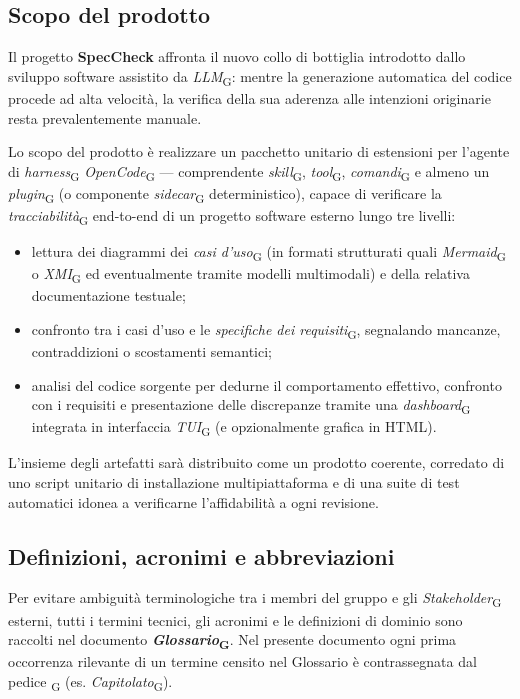 \documentclass[11pt, a4paper]{article}
\newcommand{\glossario}[1]{\textit{#1}\textsubscript{G}}
\begin{document}
\subsection{Scopo del prodotto}
Il progetto \textbf{SpecCheck} affronta il nuovo collo di bottiglia introdotto dallo sviluppo software assistito da \glossario{LLM}: mentre la generazione automatica del codice procede ad alta velocità, la verifica della sua aderenza alle intenzioni originarie resta prevalentemente manuale.

Lo scopo del prodotto è realizzare un pacchetto unitario di estensioni per l'agente di \glossario{harness} \glossario{OpenCode} --- comprendente \glossario{skill}, \glossario{tool}, \glossario{comandi} e almeno un \glossario{plugin} (o componente \glossario{sidecar} deterministico), capace di verificare la \glossario{tracciabilità} end-to-end di un progetto software esterno lungo tre livelli:
\begin{itemize}
    \item lettura dei diagrammi dei \glossario{casi d'uso} (in formati strutturati quali \glossario{Mermaid} o \glossario{XMI} ed eventualmente tramite modelli multimodali) e della relativa documentazione testuale;
    \item confronto tra i casi d'uso e le \glossario{specifiche dei requisiti}, segnalando mancanze, contraddizioni o scostamenti semantici;
    \item analisi del codice sorgente per dedurne il comportamento effettivo, confronto con i requisiti e presentazione delle discrepanze tramite una \glossario{dashboard} integrata in interfaccia \glossario{TUI} (e opzionalmente grafica in HTML).
\end{itemize}

L'insieme degli artefatti sarà distribuito come un prodotto coerente, corredato di uno script unitario di installazione multipiattaforma e di una suite di test automatici idonea a verificarne l'affidabilità a ogni revisione.

\subsection{Definizioni, acronimi e abbreviazioni}
Per evitare ambiguità terminologiche tra i membri del gruppo e gli \glossario{Stakeholder} esterni, tutti i termini tecnici, gli acronimi e le definizioni di dominio sono raccolti nel documento \textbf{\glossario{Glossario}}. Nel presente documento ogni prima occorrenza rilevante di un termine censito nel Glossario è contrassegnata dal pedice \textsubscript{G} (es. \glossario{Capitolato}).
\end{document}
